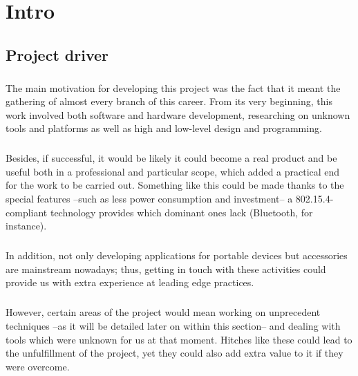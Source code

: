 \chapter{Intro}
\label{cha:intro}
	\section{Project driver}
		\paragraph{}
		The main motivation for developing this project was the fact that it meant
		the gathering of almost every branch of this career. From its very beginning, this
		work involved both software and hardware development, researching on unknown 
		tools and platforms as well as high and low-level design and programming.
		
		\paragraph{}
		Besides, if successful, it would be likely it could become a real product
		and be useful both in a professional and particular scope, which added a practical
		end for the work to be carried out. Something like this could be made thanks to
		the special features --such as less power consumption and investment-- a 802.15.4-compliant
		technology provides which dominant ones lack (Bluetooth, for instance).
		
		\paragraph{}
		In addition, not only developing applications for portable devices but accessories
		are mainstream nowadays; thus, getting in touch with these activities could
		provide us with extra experience at leading edge practices.
		
		\paragraph{}
		However, certain areas of the project would mean working on unprecedent techniques
		--as it will be detailed later on within this section-- and dealing with tools
		which were unknown for us at that moment. Hitches like these could lead to the
		unfulfillment of the project, yet they could also add extra value to it if 
		they were overcome.		
		
